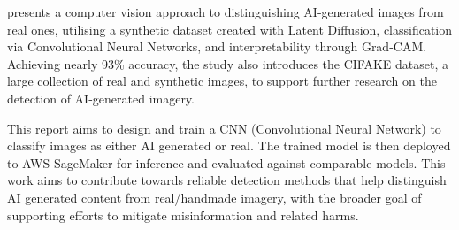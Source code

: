 \cite{bird2023cifakeimageclassificationexplainable} presents a computer vision approach to distinguishing AI-generated images from real ones, utilising a synthetic dataset created with Latent Diffusion, classification via Convolutional Neural Networks, and interpretability through Grad-CAM. Achieving nearly 93\% accuracy, the study also introduces the CIFAKE dataset, a large collection of real and synthetic images, to support further research on the detection of AI-generated imagery.

This report aims to design and train a CNN (Convolutional Neural Network) to classify images as either AI generated or real. The trained model is then deployed to AWS SageMaker for inference and evaluated against comparable models. This work aims to contribute towards reliable detection methods that help distinguish AI generated content from real/handmade imagery, with the broader goal of supporting efforts to mitigate misinformation and related harms.

